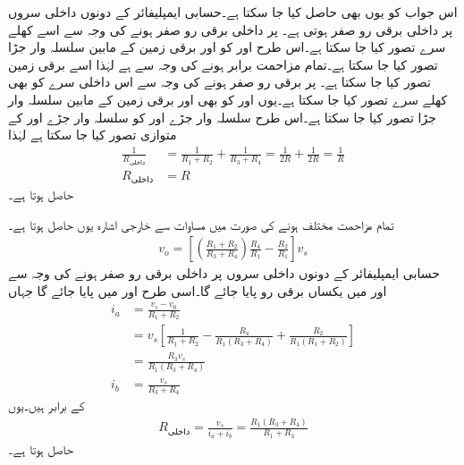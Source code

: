 اس جواب کو یوں بھی حاصل کیا جا سکتا ہے۔حسابی ایمپلیفائر کے دونوں داخلی سروں  پر داخلی برقی رو صفر ہوتی ہے۔ پر داخلی برقی رو صفر  ہونے کی وجہ سے اسے کھلے سرے تصور کیا جا سکتا ہے۔اس طرح   اور  کو  اور برقی زمین کے مابین سلسلہ وار جڑا تصور کیا جا سکتا ہے۔تمام مزاحمت برابر ہونے کی وجہ سے  ہے لہٰذا اسے برقی زمین تصور کیا جا سکتا ہے۔ پر برقی رو صفر ہونے کی وجہ سے اس داخلی سرے  کو بھی کھلے سرے تصور کیا جا سکتا ہے۔یوں  اور  کو بھی  اور برقی زمین کے مابین سلسلہ وار جڑا تصور کیا جا سکتا ہے۔اس طرح سلسلہ وار جڑے  اور  کو سلسلہ وار جڑے  اور  کے متوازی تصور کیا جا سکتا ہے لہٰذا
\begin{align*}
\frac{1}{R_{\textrm{داخلی}}}&=\frac{1}{R_1+R_2}+\frac{1}{R_3+R_4}=\frac{1}{2R}+\frac{1}{2R}=\frac{1}{R}\\
R_{\textrm{داخلی}}&=R
\end{align*}
حاصل ہوتا ہے۔

تمام مزاحمت مختلف ہونے کی صورت میں مساوات  سے خارجی اشارہ  یوں حاصل ہوتا ہے۔
\begin{align*}
v_o=\left[\left(\frac{R_1+R_2}{R_3+R_4} \right)\frac{R_4}{R_1}-\frac{R_2}{R_1} \right]v_s
\end{align*}
حسابی ایمپلیفائر کے دونوں داخلی سروں  پر داخلی برقی رو صفر ہونے کی وجہ سے  اور  میں یکساں برقی رو  پایا جائے گا۔اسی طرح  اور  میں  پایا جائے گا جہاں
\begin{align*}
i_a&=\frac{v_s-v_0}{R_1+R_2}\\
&=v_s\left[\frac{1}{R_1+R_2}-\frac{R_4}{R_1 \left(R_3+R_4 \right)}+\frac{R_2}{R_1 \left(R_1+R_2 \right)} \right]\\
&=\frac{R_3 v_s}{R_1\left(R_3+R_4 \right)}\\
i_b&=\frac{v_s}{R_3+R_4}
\end{align*}
کے برابر ہیں۔یوں
\begin{align*}
R_{\textrm{داخلی}}=\frac{v_s}{i_a+i_b}=\frac{R_1 \left(R_3+R_4 \right)}{R_1+R_3}
\end{align*}
حاصل ہوتا ہے۔

